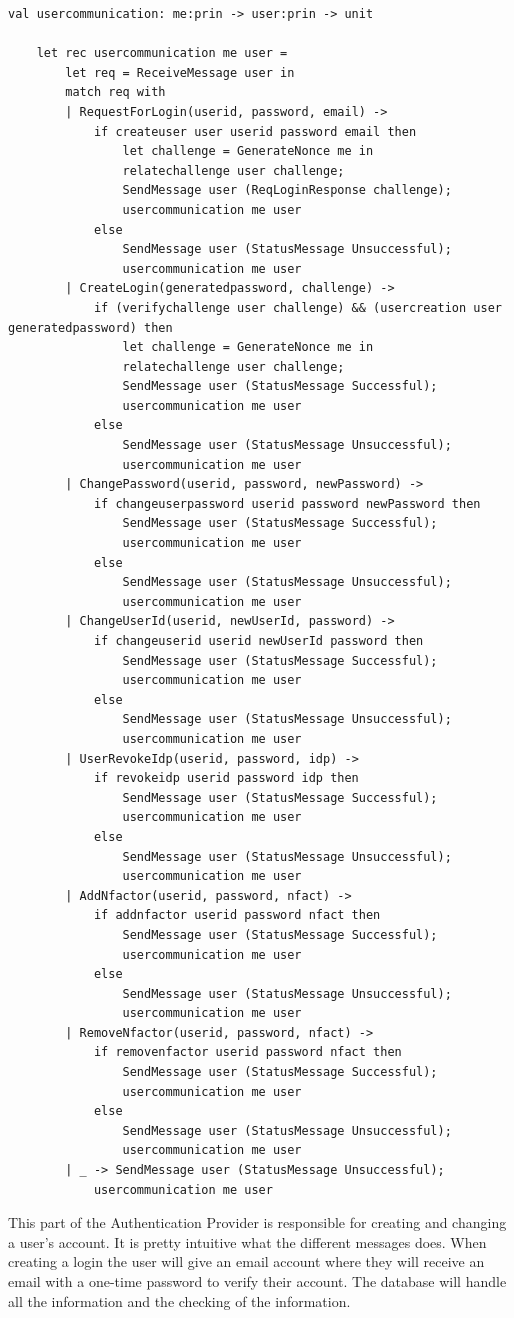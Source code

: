 \documentclass[twosided]{report}
\begin{document}
\begin{lstlisting}[style=fstar, caption={The creation and changing of a user's account}]
	val usercommunication: me:prin -> user:prin -> unit

	let rec usercommunication me user =
		let req = ReceiveMessage user in
		match req with
		| RequestForLogin(userid, password, email) -> 
			if createuser user userid password email then
				let challenge = GenerateNonce me in
				relatechallenge user challenge;
				SendMessage user (ReqLoginResponse challenge);
				usercommunication me user
			else
				SendMessage user (StatusMessage Unsuccessful);
				usercommunication me user
		| CreateLogin(generatedpassword, challenge) ->
			if (verifychallenge user challenge) && (usercreation user generatedpassword) then
				let challenge = GenerateNonce me in
				relatechallenge user challenge;
				SendMessage user (StatusMessage Successful);
				usercommunication me user
			else
				SendMessage user (StatusMessage Unsuccessful);
				usercommunication me user
		| ChangePassword(userid, password, newPassword) ->
			if changeuserpassword userid password newPassword then
				SendMessage user (StatusMessage Successful);
				usercommunication me user
			else
				SendMessage user (StatusMessage Unsuccessful);
				usercommunication me user
		| ChangeUserId(userid, newUserId, password) ->
			if changeuserid userid newUserId password then
				SendMessage user (StatusMessage Successful);
				usercommunication me user
			else
				SendMessage user (StatusMessage Unsuccessful);
				usercommunication me user
		| UserRevokeIdp(userid, password, idp) ->
			if revokeidp userid password idp then
				SendMessage user (StatusMessage Successful);
				usercommunication me user
			else
				SendMessage user (StatusMessage Unsuccessful);
				usercommunication me user
		| AddNfactor(userid, password, nfact) ->
			if addnfactor userid password nfact then
				SendMessage user (StatusMessage Successful);
				usercommunication me user
			else
				SendMessage user (StatusMessage Unsuccessful);
				usercommunication me user
		| RemoveNfactor(userid, password, nfact) ->
			if removenfactor userid password nfact then
				SendMessage user (StatusMessage Successful);
				usercommunication me user
			else
				SendMessage user (StatusMessage Unsuccessful);
				usercommunication me user
		| _ -> SendMessage user (StatusMessage Unsuccessful);
			usercommunication me user
\end{lstlisting}
This part of the Authentication Provider is responsible for creating and changing a user's account. It is pretty intuitive what the different messages does. When creating a login the user will give an email account where they will receive an email with a one-time password to verify their account. The database will handle all the information and the checking of the information.
\end{document}
